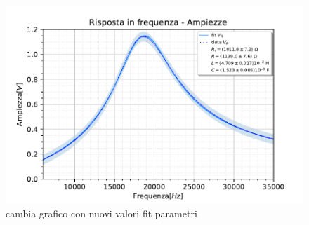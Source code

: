 \begin{figure}[h]
    \centering
    \includegraphics[width=.9\textwidth]{../figs/Risposta-in-frequenza-ampiezza-resistenza.pdf}
    \caption{cambia grafico con nuovi valori fit parametri}\label{fig:ampiezzeR}
\end{figure}




